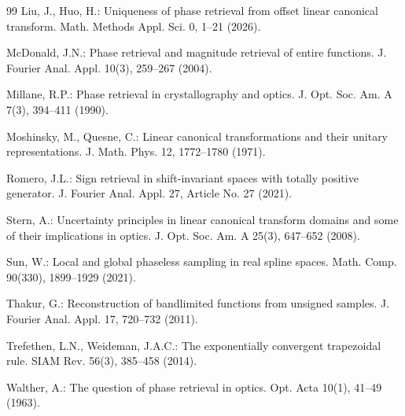 \documentclass[11pt, reqno]{amsart}
\numberwithin{equation}{section}
\begin{document}
\begin{thebibliography}{99}
    Liu, J., Huo, H.: Uniqueness of phase retrieval from offset linear canonical transform. Math. Methods Appl. Sci. 0, 1--21 (2026).

	McDonald, J.N.: Phase retrieval and magnitude retrieval of entire functions. J. Fourier Anal. Appl. 10(3), 259--267 (2004).

	Millane, R.P.: Phase retrieval in crystallography and optics. J. Opt. Soc. Am. A 7(3), 394--411 (1990).

    Moshinsky, M., Quesne, C.: Linear canonical transformations and their unitary representations. J. Math. Phys. 12, 1772--1780 (1971).

	Romero, J.L.: Sign retrieval in shift-invariant spaces with totally positive generator. J. Fourier Anal. Appl. 27,  Article No. 27 (2021).


Stern, A.: Uncertainty principles in linear canonical transform domains and some of their implications in optics. J. Opt. Soc. Am. A 25(3), 647--652 (2008).

    Sun, W.: Local and global phaseless sampling in real spline spaces. Math. Comp. 90(330), 1899--1929 (2021).

	Thakur, G.: Reconstruction of bandlimited functions from unsigned samples. J. Fourier Anal. Appl. 17, 720--732 (2011).

Trefethen, L.N., Weideman, J.A.C.: The exponentially convergent trapezoidal rule. SIAM Rev. 56(3), 385--458 (2014).

	Walther, A.: The question of phase retrieval in optics. Opt. Acta 10(1), 41--49 (1963).




\end{thebibliography}
\end{document}
